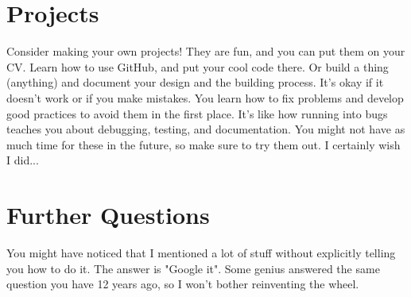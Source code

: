 \section{Projects}

Consider making your own projects! They are fun, and you can put them on your CV. Learn how to use GitHub, and put your cool code there. Or build a thing (anything) and document your design and the building process. It's okay if it doesn't work or if you make mistakes. You learn how to fix problems and develop good practices to avoid them in the first place. It's like how running into bugs teaches you about debugging, testing, and documentation. You might not have as much time for these in the future, so make sure to try them out. I certainly wish I did...

\section{Further Questions}

You might have noticed that I mentioned a lot of stuff without explicitly telling you how to do it. The answer is "Google it". Some genius answered the same question you have 12 years ago, so I won't bother reinventing the wheel.
